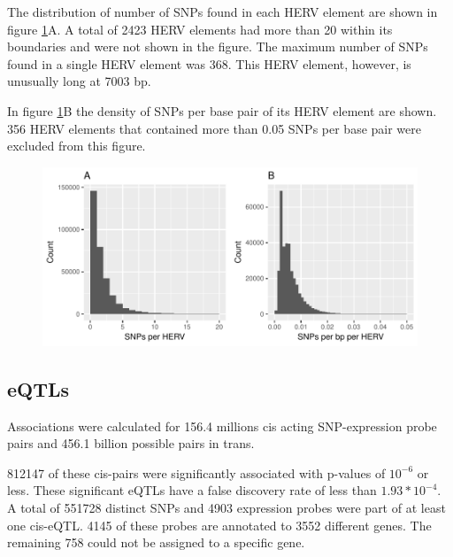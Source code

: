 \documentclass[a4paper,12pt,twoside,openright]{article}
\begin{document}
The distribution of number of SNPs found in each HERV element are shown in figure \ref{fig:hervS2.snp.hist}A. A total of 2423 HERV elements had more than 20 within its boundaries and were not shown in the figure. The maximum number of SNPs found in a single HERV element was 368. This HERV element, however, is unusually long at 7003 bp. 

In figure \ref{fig:hervS2.snp.hist}B the density of SNPs per base pair of its HERV element are shown. 356 HERV elements that contained more than 0.05 SNPs per base pair were excluded from this figure.

\begin{figure}[tb]
	\includegraphics[scale = 1, keepaspectratio = true]{../figures/hervS2_snp_hist}  
	\caption{}
    \label{fig:hervS2.snp.hist}
\end{figure}



\subsection{eQTLs}
\label{Results:eQTLs}
Associations were calculated for 156.4 millions cis acting SNP-expression probe pairs and 456.1 billion possible pairs in trans. 

812147 of these cis-pairs were significantly associated with p-values of $10^{-6}$ or less. These significant eQTLs have a false discovery rate of less than $1.93*10^{-4}$. A total of 551728 distinct SNPs and 4903 expression probes were part of at least one cis-eQTL. 4145 of these probes are annotated to 3552 different genes. The remaining 
758 could not be assigned to a specific gene.
\end{document}
